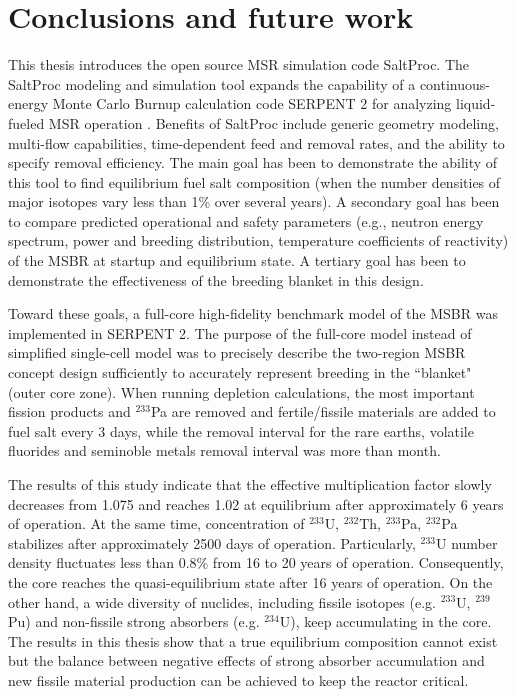 \chapter[Conclusions and furture work]{Conclusions and future work}
This thesis introduces the open source \gls{MSR} simulation code SaltProc. The SaltProc modeling and simulation tool expands the capability of a continuous-energy Monte Carlo Burnup calculation code SERPENT 2 for analyzing liquid-fueled \gls{MSR} operation \cite{andrei_rykhlevskii_arfc/saltproc:_2018}. Benefits of SaltProc include generic geometry modeling, multi-flow capabilities, time-dependent feed and removal rates, and the ability to specify removal efficiency. The main goal has been to demonstrate the ability of this tool to find equilibrium fuel salt composition (when the number densities of major isotopes vary less than 1\% over several years). A secondary goal has been to compare predicted operational and safety parameters (e.g., neutron energy spectrum, power and breeding distribution, temperature coefficients of reactivity) of the \gls{MSBR} at startup and equilibrium state. A tertiary goal has been to demonstrate the effectiveness of the breeding blanket in this design.

Toward these goals, a full-core high-fidelity benchmark model of the \gls{MSBR} was implemented in SERPENT 2. The purpose of the full-core model instead of simplified single-cell model \cite{rykhlevskii_online_2017, betzler_molten_2017} was to precisely describe the two-region \gls{MSBR} concept design sufficiently to accurately represent breeding in the ``blanket" (outer core zone). When running depletion calculations, the most important fission products and $^{233}$Pa are removed and fertile/fissile materials are added to fuel salt every 3 days, while the removal interval for the rare earths, volatile fluorides and seminoble metals removal interval was more than month. 

The results of this study indicate that the effective multiplication factor slowly decreases from 1.075 and reaches 1.02 at equilibrium after approximately 6 years of operation. At the same time, concentration of $^{233}$U, $^{232}$Th, $^{233}$Pa, $^{232}$Pa stabilizes after approximately 2500 days of operation. Particularly, $^{233}$U number density fluctuates less than 0.8\% from 16 to 20 years of operation. Consequently, the core reaches the quasi-equilibrium state after 16 years of operation. On the other hand, a wide diversity of nuclides, including fissile isotopes (e.g. $^{233}$U, $^{239}$Pu) and non-fissile strong absorbers (e.g. $^{234}$U), keep accumulating in the core. The results in this thesis show that a true equilibrium composition cannot exist but the balance between negative effects of strong absorber accumulation and new fissile material production can be achieved to keep the reactor critical.

